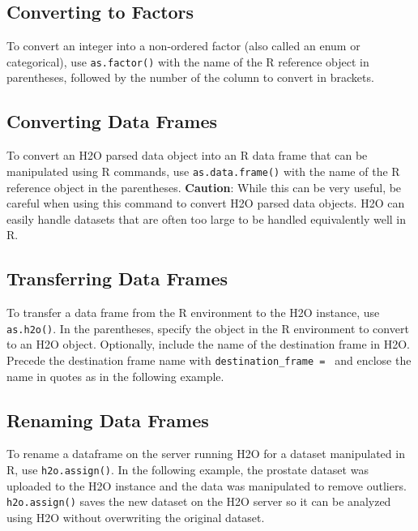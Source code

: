 {{\subsection{Converting to Factors}
To convert an integer into a non-ordered factor (also called an enum or categorical), use {\texttt{as.factor()}} with the name of the R reference object in parentheses, followed by the number of the column to convert in brackets.

\waterExampleInR
\medskip


\subsection{Converting Data Frames}

To convert an H2O parsed data object into an R data frame that can be manipulated using R commands, use {\texttt{as.data.frame()}} with the name of the R reference object in the parentheses.
{\textbf{Caution}}: While this can be very useful, be careful when using this command to convert H2O parsed data objects. H2O can easily handle datasets that are often too large to be handled equivalently well in R.

\waterExampleInR
\medskip


\subsection{Transferring Data Frames}
To transfer a data frame from the R environment to the H2O instance, use  {\texttt{as.h2o()}}. In the parentheses, specify the object in the R environment to convert to an H2O object. Optionally, include the name of the destination frame in H2O. Precede the destination frame name with {\texttt{destination\_frame = }} and enclose the name in quotes as in the following example.

\waterExampleInR
\medskip



\subsection{Renaming Data Frames}
To rename a dataframe on the server running H2O for a dataset manipulated in R, use {\texttt{h2o.assign()}}. In the following example, the prostate dataset was uploaded to the H2O instance and the data was manipulated to remove outliers. {\texttt{h2o.assign()}} saves the new dataset on the H2O server so it can be analyzed using H2O without overwriting the original dataset.

}}
